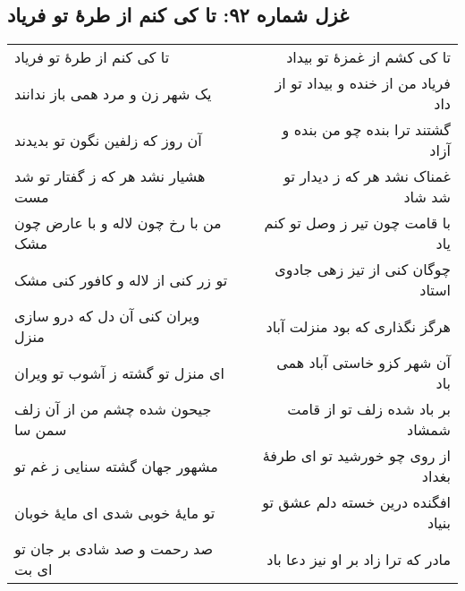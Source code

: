 \begin{center}
\section*{غزل شماره ۹۲: تا کی کنم از طرهٔ تو فریاد}
\label{sec:092}
\begin{longtable}{l p{0.5cm} r}
تا کی کنم از طرهٔ تو فریاد
&&
تا کی کشم از غمزهٔ تو بیداد
\\
یک شهر زن و مرد همی باز ندانند
&&
فریاد من از خنده و بیداد تو از داد
\\
آن روز که زلفین نگون تو بدیدند
&&
گشتند ترا بنده چو من بنده و آزاد
\\
هشیار نشد هر که ز گفتار تو شد مست
&&
غمناک نشد هر که ز دیدار تو شد شاد
\\
من با رخ چون لاله و با عارض چون مشک
&&
با قامت چون تیر ز وصل تو کنم یاد
\\
تو زر کنی از لاله و کافور کنی مشک
&&
چوگان کنی از تیز زهی جادوی استاد
\\
ویران کنی آن دل که درو سازی منزل
&&
هرگز نگذاری که بود منزلت آباد
\\
ای منزل تو گشته ز آشوب تو ویران
&&
آن شهر کزو خاستی آباد همی باد
\\
جیحون شده چشم من از آن زلف سمن سا
&&
بر باد شده زلف تو از قامت شمشاد
\\
مشهور جهان گشته سنایی ز غم تو
&&
از روی چو خورشید تو ای طرفهٔ بغداد
\\
تو مایهٔ خوبی شدی ای مایهٔ خوبان
&&
افگنده درین خسته دلم عشق تو بنیاد
\\
صد رحمت و صد شادی بر جان تو ای بت
&&
مادر که ترا زاد بر او نیز دعا باد
\\
\end{longtable}
\end{center}
